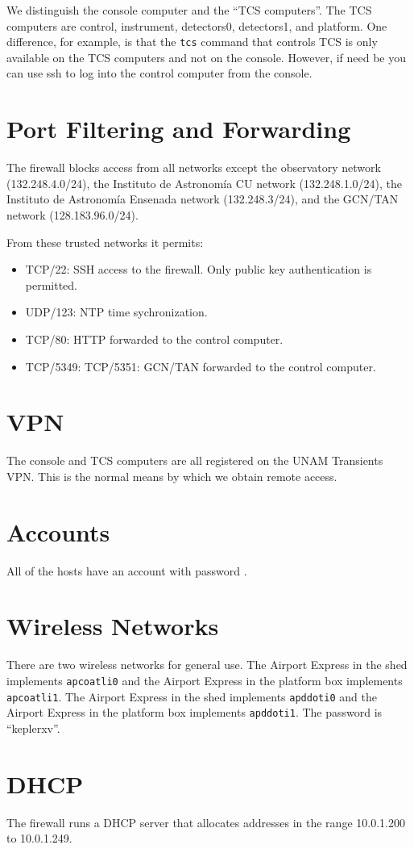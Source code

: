 We distinguish the console computer and the “TCS computers”. The TCS computers are control, 
\ifcoatli
instrument,
\fi
\ifddoti
detectors0, detectors1,
\fi
and platform. One difference, for example, is that the \verb|tcs| command that controls TCS is only available on the TCS computers and not on the console. However, if need be you can use ssh to log into the control computer from the console.

\section{Port Filtering and Forwarding}

The firewall blocks access from all networks except the observatory network (132.248.4.0/24), the Instituto de Astronomía CU network (132.248.1.0/24), the Instituto de Astronomía Ensenada network (132.248.3/24), and the GCN/TAN network (128.183.96.0/24).

From these trusted networks it permits:
\begin{itemize}
\item TCP/22: SSH access to the firewall. Only public key authentication is permitted.
\item UDP/123: NTP time sychronization.
\item TCP/80: HTTP forwarded to the control computer.
\item
\ifcoatli
TCP/5349:
\fi
\ifddoti
TCP/5351:
\fi
GCN/TAN forwarded to the control computer.
\end{itemize}

\section{VPN}

The console and TCS computers are all registered on the UNAM Transients VPN. This is the normal means by which we obtain remote access.

\section{Accounts}

All of the hosts have an account {\projectaccount} with password {\projectaccount}.

\section{Wireless Networks}

There are two wireless networks for general use. 
\ifcoatli
The Airport Express in the shed implements \verb|apcoatli0| and the Airport Express in the platform box implements \verb|apcoatli1|. 
\fi
\ifddoti
The Airport Express in the shed implements \verb|apddoti0| and the Airport Express in the platform box implements \verb|apddoti1|. 
\fi
The password is “keplerxv”.

\section{DHCP}

The firewall runs a DHCP server that allocates addresses in the range 10.0.1.200 to 10.0.1.249.

